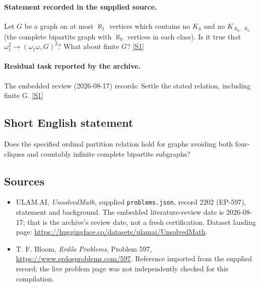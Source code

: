 \documentclass[11pt,a4paper]{article}
\newcommand{\sref}[2]{\hyperlink{source:#1:#2}{[S#2]}}
\begin{document}
\paragraph{Statement recorded in the supplied source.}
Let $G$ be a graph on at most $\aleph_1$ vertices which contains no $K_4$ and no $K_{\aleph_0,\aleph_0}$ (the complete bipartite graph with $\aleph_0$ vertices in each class). Is it true that $ \omega_1^2 \to (\omega_1\omega, G)^2? $ What about finite $G$? \sref{2202}{1}

\paragraph{Residual task reported by the archive.}

The embedded review (2026-08-17) records: Settle the stated relation, including finite G. \sref{2202}{1}

\subsection{Short English statement}

Does the specified ordinal partition relation hold for graphs avoiding both four-cliques and countably infinite complete bipartite subgraphs?

\subsection{Sources}

{\small

\begin{itemize}

\item[\hypertarget{source:2202:1}{S1}] ULAM.AI, \emph{UnsolvedMath}, supplied \texttt{problems.json}, record 2202 (EP-597), statement and background. The embedded literature-review date is 2026-08-17; that is the archive’s review date, not a fresh certification. Dataset landing page: \url{https://huggingface.co/datasets/ulamai/UnsolvedMath}.

\item[\hypertarget{source:2202:2}{S2}] T. F. Bloom, \emph{Erdős Problems}, Problem 597, \url{https://www.erdosproblems.com/597}. Reference imported from the supplied record; the live problem page was not independently checked for this compilation.

\end{itemize}

}

\label{end:2202}
\end{document}
